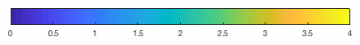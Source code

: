 \documentclass{article}
\begin{document}
\begin{figure}[htp]
\begin{subfigure}{.33\textwidth}
 \label{fig:nutrients2}
\end{subfigure}
\\[+0.2cm]
\begin{subfigure}{.5\textwidth}
 \includegraphics[width=0.95\linewidth]{../Separate_figures/ECOGEM/ocn_PO4_profile_clrbr.png}
\end{subfigure}
\end{figure}
\end{document}
